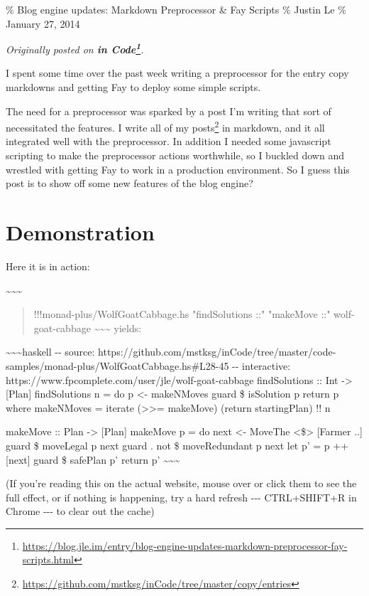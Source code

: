 \documentclass[]{article}
\renewcommand{\href}[2]{#2\footnote{\url{#1}}}
\begin{document}
\% Blog engine updates: Markdown Preprocessor \& Fay Scripts \% Justin Le \%
January 27, 2014

\emph{Originally posted on
\textbf{\href{https://blog.jle.im/entry/blog-engine-updates-markdown-preprocessor-fay-scripts.html}{in
Code}}.}

I spent some time over the past week writing a preprocessor for the entry copy
markdowns and getting Fay to deploy some simple scripts.

The need for a preprocessor was sparked by a post I'm writing that sort of
necessitated the features. I write
\href{https://github.com/mstksg/inCode/tree/master/copy/entries}{all of my
posts} in markdown, and it all integrated well with the preprocessor. In
addition I needed some javascript scripting to make the preprocessor actions
worthwhile, so I buckled down and wrestled with getting Fay to work in a
production environment. So I guess this post is to show off some new features of
the blog engine?

\section{Demonstration}

Here it is in action:

\textasciitilde{}\textasciitilde{}\textasciitilde{}

\begin{quote}
!!!monad-plus/WolfGoatCabbage.hs "findSolutions ::" "makeMove ::"
wolf-goat-cabbage \textasciitilde{}\textasciitilde{}\textasciitilde{} yields:
\end{quote}

\textasciitilde{}\textasciitilde{}\textasciitilde{}haskell -\/- source:
https://github.com/mstksg/inCode/tree/master/code-samples/monad-plus/WolfGoatCabbage.hs\#L28-45
-\/- interactive: https://www.fpcomplete.com/user/jle/wolf-goat-cabbage
findSolutions :: Int -\textgreater{} {[}Plan{]} findSolutions n = do p
\textless{}- makeNMoves guard \$ isSolution p return p where makeNMoves =
iterate (\textgreater{}\textgreater{}= makeMove) (return startingPlan) !! n

makeMove :: Plan -\textgreater{} {[}Plan{]} makeMove p = do next \textless{}-
MoveThe \textless{}\$\textgreater{} {[}Farmer ..{]} guard \$ moveLegal p next
guard . not \$ moveRedundant p next let p' = p ++ {[}next{]} guard \$ safePlan
p' return p' \textasciitilde{}\textasciitilde{}\textasciitilde{}

(If you're reading this on the actual website, mouse over or click them to see
the full effect, or if nothing is happening, try a hard refresh -\/-\/-
CTRL+SHIFT+R in Chrome -\/-\/- to clear out the cache)
\end{document}
